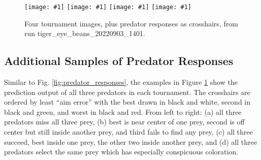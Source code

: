 \documentclass[letterpaper]{article}
\newcommand{\runID}{\footnotesize}
\newcommand{\igfour}[1]{\texttt{[image: \#1]}}
\begin{document}
\newpage

\begin{figure}[t]
    \igfour{20220904_step_4883.png}
    \hfill
    \igfour{20220904_step_4788.png}
    \hfill
    \igfour{20220904_step_3914.png}
    \hfill
    \igfour{20220904_step_4636.png}
    \caption{Four tournament images, plus predator responses as crosshairs, from run {\runID tiger\_eye\_beans\_20220903\_1401}.}
    \label{fig:tiger_eye_beans_4x}
\end{figure}


\subsection{Additional Samples of Predator Responses}
\label{sec:additional_predator_responses}
Similar to Fig. \ref{fig:predator_responses}, the examples in Figure \ref{fig:tiger_eye_beans_4x} show the prediction output of all three predators in each tournament. The crosshairs are ordered by least ``aim error'' with the best drawn in black and white, second in black and green, and worst in black and red. From left to right: (a) all three predators miss all three prey, (b) best is near center of one prey, second is off center but still inside another prey, and third fails to find any prey, (c) all three succeed, best inside one prey, the other two inside another prey, and (d) all three predators select the same prey which has especially conspicuous coloration.
\par

\end{document}
